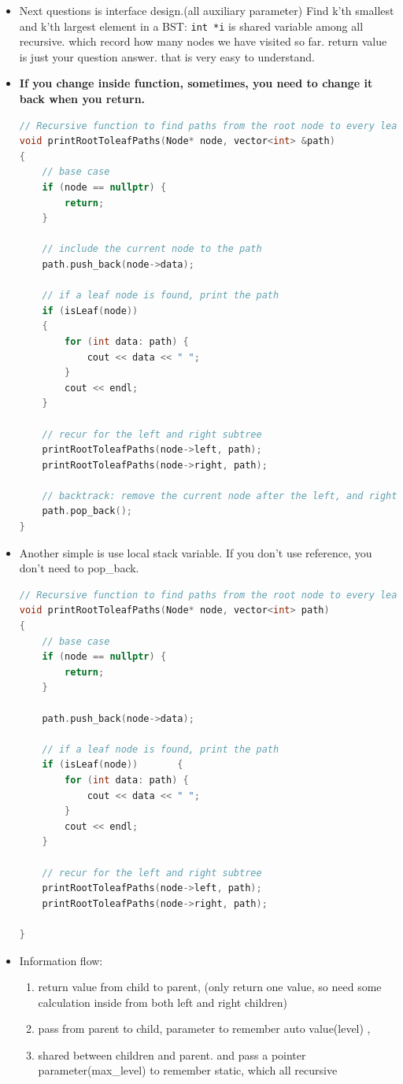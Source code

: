 \documentclass[a4paper,11pt,twoside]{book}
\begin{document}
\begin{itemize}
	\item Next questions is interface design.(all auxiliary parameter)
Find k’th smallest and k’th largest element in a BST:  \texttt{int *i} is shared variable among all recursive. which record how many nodes we have visited so far. return value is just your question answer. that is very easy to understand. 
	

\item \textbf{If you change inside function, sometimes, you need to change it back when you return.}
\begin{lstlisting}[frame=single, language=c++]
// Recursive function to find paths from the root node to every leaf node
void printRootToleafPaths(Node* node, vector<int> &path)
{
	// base case
	if (node == nullptr) {
		return;
	}
	
	// include the current node to the path
	path.push_back(node->data);
	
	// if a leaf node is found, print the path
	if (isLeaf(node))
	{
		for (int data: path) {
			cout << data << " ";
		}
		cout << endl;
	}
	
	// recur for the left and right subtree
	printRootToleafPaths(node->left, path);
	printRootToleafPaths(node->right, path);
	
	// backtrack: remove the current node after the left, and right subtree are done
	path.pop_back();
}	
\end{lstlisting}

\item Another simple is use local stack variable. If you don't use reference, you don't need to pop\_back.
\begin{lstlisting}[frame=single, language=c++]
// Recursive function to find paths from the root node to every leaf node
void printRootToleafPaths(Node* node, vector<int> path)
{
	// base case
	if (node == nullptr) {
		return;
	}
	
	path.push_back(node->data);
	
	// if a leaf node is found, print the path
	if (isLeaf(node))		{
		for (int data: path) {
			cout << data << " ";
		}
		cout << endl;
	}
	
	// recur for the left and right subtree
	printRootToleafPaths(node->left, path);
	printRootToleafPaths(node->right, path);
	
}		
\end{lstlisting}


\item Information flow:
\begin{enumerate}
	\item  return value from child to parent, (only return one value, so need some calculation inside from both left and right children)
	\item pass from parent to child, parameter to remember auto value(level) , 
	\item shared between children and parent. and pass a pointer parameter(max\_level) to remember static, which all recursive 
\end{enumerate}
	
\end{itemize}
\end{document}
